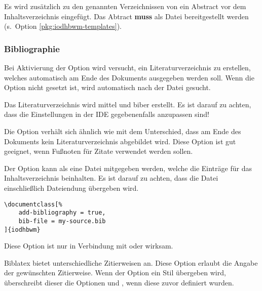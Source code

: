\documentclass[babel=ngerman,highlight=false]{skdoc}
\begin{document}
                Es wird zusätzlich zu den genannten Verzeichnissen von  ein Abstract vor dem Inhaltsverzeichnis eingefügt. Das Abtract \textbf{muss} als Datei bereitgestellt werden (s.~Option  \ref{pkg:iodhbwm-templates}).

            \subsubsection{Bibliographie}
                Bei Aktivierung der Option wird versucht, ein Literaturverzeichnis zu erstellen, welches automatisch am Ende des Dokuments ausgegeben werden soll. Wenn die Option  nicht gesetzt ist, wird automatisch nach der Datei  gesucht.

                Das Literaturverzeichnis wird mittel  und biber erstellt. Es ist darauf zu achten, dass die Einstellungen in der IDE gegebenenfalls anzupassen sind!\medskip

                Die Option verhält sich ähnlich wie  mit dem Unterschied, dass am Ende des Dokuments kein Literaturverzeichnis abgebildet wird. Diese Option ist gut geeignet, wenn Fußnoten für Zitate verwendet werden sollen.\medskip

                Der Option kann als  eine Datei mitgegeben werden, welche die Einträge für das Inhaltsverzeichnis beinhalten. Es ist darauf zu achten, dass die Datei einschließlich Dateiendung übergeben wird.
                \begin{verbatim}
\documentclass[%
    add-bibliography = true,
    bib-file = my-source.bib
]{iodhbwm}
                \end{verbatim}
                Diese Option ist nur in Verbindung mit  oder  wirksam.\medskip

                Biblatex bietet unterschiedliche Zitierweisen an. Diese Option erlaubt die Angabe der gewünschten Zitierweise. Wenn der Option ein Stil übergeben wird, überschreibt dieser die Optionen  und , wenn diese zuvor definiert wurden.\medskip
\end{document}
